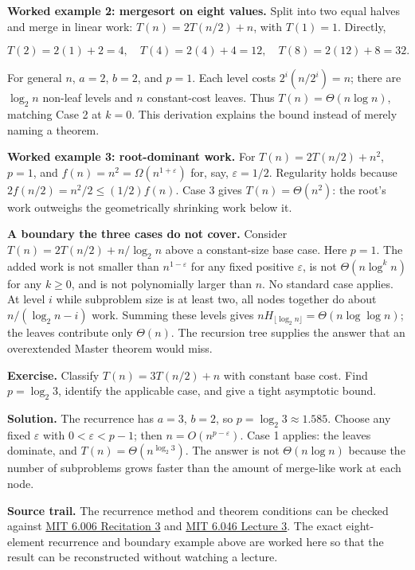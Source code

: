 \textbf{Worked example 2: mergesort on eight values.} Split into two equal halves and merge in linear work: \(T(n)=2T(n/2)+n\), with \(T(1)=1\). Directly,

\[
T(2)=2(1)+2=4,\quad T(4)=2(4)+4=12,\quad T(8)=2(12)+8=32.
\]

For general \(n\), \(a=2\), \(b=2\), and \(p=1\). Each level costs \(2^i(n/2^i)=n\); there are \(\log_2 n\) non-leaf levels and \(n\) constant-cost leaves. Thus \(T(n)=\Theta(n\log n)\), matching Case 2 at \(k=0\). This derivation explains the bound instead of merely naming a theorem.

\textbf{Worked example 3: root-dominant work.} For \(T(n)=2T(n/2)+n^2\), \(p=1\), and \(f(n)=n^2=\Omega(n^{1+\varepsilon})\) for, say, \(\varepsilon=1/2\). Regularity holds because \(2f(n/2)=n^2/2\leq(1/2)f(n)\). Case 3 gives \(T(n)=\Theta(n^2)\): the root's work outweighs the geometrically shrinking work below it.

\textbf{A boundary the three cases do not cover.} Consider \(T(n)=2T(n/2)+n/\log_2 n\) above a constant-size base case. Here \(p=1\). The added work is not smaller than \(n^{1-\varepsilon}\) for any fixed positive \(\varepsilon\), is not \(\Theta(n\log^k n)\) for any \(k\geq0\), and is not polynomially larger than \(n\). No standard case applies. At level \(i\) while subproblem size is at least two, all nodes together do about \(n/(\log_2 n-i)\) work. Summing these levels gives \(n H_{\lfloor\log_2 n\rfloor}=\Theta(n\log\log n)\); the leaves contribute only \(\Theta(n)\). The recursion tree supplies the answer that an overextended Master theorem would miss.

\textbf{Exercise.} Classify \(T(n)=3T(n/2)+n\) with constant base cost. Find \(p=\log_2 3\), identify the applicable case, and give a tight asymptotic bound.

\textbf{Solution.} The recurrence has \(a=3\), \(b=2\), so \(p=\log_2 3\approx1.585\). Choose any fixed \(\varepsilon\) with \(0<\varepsilon<p-1\); then \(n=O(n^{p-\varepsilon})\). Case 1 applies: the leaves dominate, and \(T(n)=\Theta(n^{\log_2 3})\). The answer is not \(\Theta(n\log n)\) because the number of subproblems grows faster than the amount of merge-like work at each node.

\textbf{Source trail.} The recurrence method and theorem conditions can be checked against \href{https://ocw.mit.edu/courses/6-006-introduction-to-algorithms-spring-2020/1869dbf640ded6b31f1bd369d2001ef5_MIT6_006S20_r03.pdf}{MIT 6.006 Recitation 3} and \href{https://ocw.mit.edu/courses/6-046j-introduction-to-algorithms-sma-5503-fall-2005/9cdb6914be3e87215cb86f327ee4180b_lec3.pdf}{MIT 6.046 Lecture 3}. The exact eight-element recurrence and boundary example above are worked here so that the result can be reconstructed without watching a lecture.

